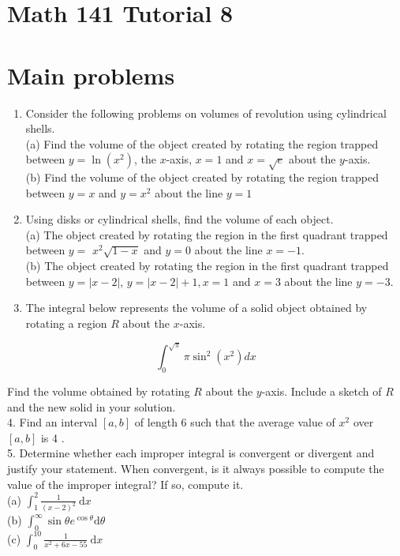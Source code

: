 \documentclass[10pt]{article}
\begin{document}
\section*{Math 141 Tutorial 8}
\section*{Main problems}
\begin{enumerate}
  \item Consider the following problems on volumes of revolution using cylindrical shells.\\
(a) Find the volume of the object created by rotating the region trapped between $y=\ln \left(x^{2}\right)$, the $x$-axis, $x=1$ and $x=\sqrt{e}$ about the $y$-axis.\\
(b) Find the volume of the object created by rotating the region trapped between $y=x$ and $y=x^{2}$ about the line $y=1$
  \item Using disks or cylindrical shells, find the volume of each object.\\
(a) The object created by rotating the region in the first quadrant trapped between $y=$ $x^{2} \sqrt{1-x}$ and $y=0$ about the line $x=-1$.\\
(b) The object created by rotating the region in the first quadrant trapped between $y=|x-2|$, $y=|x-2|+1, x=1$ and $x=3$ about the line $y=-3$.
  \item The integral below represents the volume of a solid object obtained by rotating a region $R$ about the $x$-axis.
\end{enumerate}

$$
\int_{0}^{\sqrt{\pi}} \pi \sin ^{2}\left(x^{2}\right) d x
$$

Find the volume obtained by rotating $R$ about the $y$-axis. Include a sketch of $R$ and the new solid in your solution.\\
4. Find an interval $[a, b]$ of length 6 such that the average value of $x^{2}$ over $[a, b]$ is 4 .\\
5. Determine whether each improper integral is convergent or divergent and justify your statement. When convergent, is it always possible to compute the value of the improper integral? If so, compute it.\\
(a) $\int_{1}^{2} \frac{1}{(x-2)^{2}} \mathrm{~d} x$\\
(b) $\int_{0}^{\infty} \sin \theta e^{\cos \theta} \mathrm{d} \theta$\\
(c) $\int_{0}^{10} \frac{1}{x^{2}+6 x-55} \mathrm{~d} x$
\end{document}
